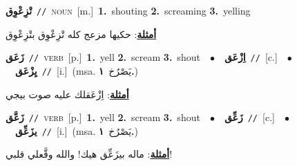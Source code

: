 \documentclass[10pt,a4paper,twoside]{article} %
\begin{document}
\begin{multicols}{2}
{\setlength\topsep{0pt}\textbf{\foreignlanguage{arabic}{تْزِعْوِق}}\ {\color{gray}\texttt{//}\color{black}}\ \textsc{noun}\ [m.]\ \textbf{1.}~shouting  \textbf{2.}~screaming  \textbf{3.}~yelling\  \begin{flushright}\color{gray}\foreignlanguage{arabic}{\textbf{\underline{\foreignlanguage{arabic}{أمثلة}}}: حكيها مزعج كله تْزِعْوِق بتْزِعْوِق}\end{flushright}\color{black}} \vspace{2mm}

{\setlength\topsep{0pt}\textbf{\foreignlanguage{arabic}{زَعَق}}\ {\color{gray}\texttt{//}\color{black}}\ \textsc{verb}\ [p.]\ \textbf{1.}~yell  \textbf{2.}~scream  \textbf{3.}~shout\ \ $\bullet$\ \ \setlength\topsep{0pt}\textbf{\foreignlanguage{arabic}{اِزْعَق}}\ {\color{gray}\texttt{//}\color{black}}\ [c.]\ \ $\bullet$\ \ \setlength\topsep{0pt}\textbf{\foreignlanguage{arabic}{يِزْعَق}}\ {\color{gray}\texttt{//}\color{black}}\ [i.]\ \color{gray}(msa. \foreignlanguage{arabic}{يَصْرُخ}~\foreignlanguage{arabic}{\textbf{١.}})\color{black}\  \begin{flushright}\color{gray}\foreignlanguage{arabic}{\textbf{\underline{\foreignlanguage{arabic}{أمثلة}}}: اِزْعَقلك عليه صوت بيجي}\end{flushright}\color{black}} \vspace{2mm}

{\setlength\topsep{0pt}\textbf{\foreignlanguage{arabic}{زَعَّق}}\ {\color{gray}\texttt{//}\color{black}}\ \textsc{verb}\ [p.]\ \textbf{1.}~yell  \textbf{2.}~scream  \textbf{3.}~shout\ \ $\bullet$\ \ \setlength\topsep{0pt}\textbf{\foreignlanguage{arabic}{زَعِّق}}\ {\color{gray}\texttt{//}\color{black}}\ [c.]\ \ $\bullet$\ \ \setlength\topsep{0pt}\textbf{\foreignlanguage{arabic}{يزَعِّق}}\ {\color{gray}\texttt{//}\color{black}}\ [i.]\ \color{gray}(msa. \foreignlanguage{arabic}{يَصْرُخ}~\foreignlanguage{arabic}{\textbf{١.}})\color{black}\  \begin{flushright}\color{gray}\foreignlanguage{arabic}{\textbf{\underline{\foreignlanguage{arabic}{أمثلة}}}: ماله بيزَعِّق هيك! والله وقَّعلي قلبي!}\end{flushright}\color{black}} \vspace{2mm}


\end{multicols}
\end{document}
